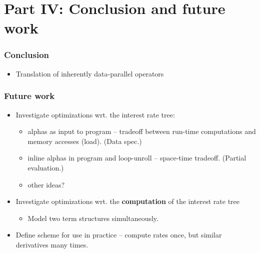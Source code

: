 \section{Part IV: Conclusion and future work}

\begin{frame}
  \frametitle{Conclusion}
%
\begin{itemize}
  \item Translation of inherently data-parallel operators
\end{itemize}
%
\end{frame}


\begin{frame}
  \frametitle{Future work}
  \begin{itemize}
  \item Investigate optimizations wrt. the interest rate
    tree:
    \begin{itemize}
      \item alphas as input to program -- tradeoff between
        run-time computations and memory accesses (load). (Data spec.)
      \item inline alphas in program and loop-unroll --
        space-time tradeoff. (Partial evaluation.)
      \item other ideas?
    \end{itemize}
  \item Investigate optimizations wrt. the
    \textbf{computation} of the interest rate tree
    \begin{itemize}
    \item Model two term structures simultaneously.
    \end{itemize}
  \item Define scheme for use in practice -- compute rates
    once, but similar derivatives many times.
  \end{itemize}
\end{frame}
